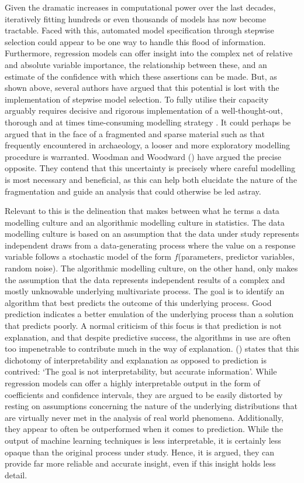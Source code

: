 \documentclass[12pt, a4paper]{article}
\begin{document}
Given the dramatic increases in computational power over the last decades, iteratively fitting hundreds or even thousands of models has now become tractable. Faced with this, automated model specification through stepwise selection could appear to be one way to handle this flood of information. Furthermore, regression models can offer insight into the complex net of relative and absolute variable importance, the relationship between these, and an estimate of the confidence with which these assertions can be made. But, as shown above, several authors have argued that this potential is lost with the implementation of stepwise model selection. To fully utilise their capacity arguably requires decisive and rigorous implementation of a well-thought-out, thorough and at times time-consuming modelling strategy \citep[e.g.][]{harrell2015}. It could perhaps be argued that in the face of a fragmented and sparse material such as that frequently encountered in archaeology, a looser and more exploratory modelling procedure is warranted. Woodman and Woodward (\citeyear{woodman2002}) have argued the precise opposite. They contend that this uncertainty is precisely where careful modelling is most necessary and beneficial, as this can help both elucidate the nature of the fragmentation and guide an analysis that could otherwise be led astray.\par
Relevant to this is the delineation that \cite{breiman2001a} makes between what he terms a data modelling culture and an algorithmic modelling culture in statistics. The data modelling culture is based on an assumption that the data under study represents independent draws from a data-generating process where the value on a response variable follows a stochastic model of the form $f$(parameters, predictor variables, random noise). The algorithmic modelling culture, on the other hand, only makes the assumption that the data represents independent results of a complex and mostly unknowable underlying multivariate process. The goal is to identify an algorithm that best predicts the outcome of this underlying process. Good prediction indicates a better emulation of the underlying process than a solution that predicts poorly. A normal criticism of this focus is that prediction is not explanation, and that despite predictive success, the algorithms in use are often too impenetrable to contribute much in the way of explanation. \citeauthor{breiman2001a} (\citeyear[][210]{breiman2001a}) states that this dichotomy of interpretability and explanation as opposed to prediction is contrived: `The goal is not interpretability, but accurate information'. While regression models can offer a highly interpretable output in the form of coefficients and confidence intervals, they are argued to be easily distorted by resting on assumptions concerning the nature of the underlying distributions that are virtually never met in the analysis of real world phenomena. Additionally, they appear to often be outperformed when it comes to prediction. While the output of machine learning techniques is less interpretable, it is certainly less opaque than the original process under study. Hence, it is argued, they can provide far more reliable and accurate insight, even if this insight holds less detail. \par
\end{document}
